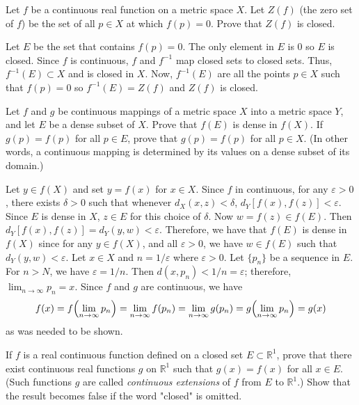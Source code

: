 \begin{exercise}
\item
  \label{4.3}
  Let \(f\) be a continuous real function on a metric space \(X\).
  Let \(Z(f)\) (the zero set of \(f\)) be the set of all \(p\in X\) at which
  \(f(p) = 0\).
  Prove that \(Z(f)\) is closed.
  \par\smallskip
  Let \(E\) be the set that contains \(f(p) = 0\).
  The only element in \(E\) is \(0\) so \(E\) is closed.
  Since \(f\) is continuous, \(f\) and \(f^{-1}\) map closed sets to closed
  sets.
  Thus, \(f^{-1}(E)\subset X\) and is closed in \(X\).
  Now, \(f^{-1}(E)\) are all the points \(p\in X\) such that \(f(p) = 0\) so
  \(f^{-1}(E) = Z(f)\) and \(Z(f)\) is closed.
\item
  \label{4.4}
  Let \(f\) and \(g\) be continuous mappings of a metric space \(X\) into a
  metric space \(Y\), and let \(E\) be a dense subset of \(X\).
  Prove that \(f(E)\) is dense in \(f(X)\).
  If \(g(p) = f(p)\) for all \(p\in E\), prove that \(g(p) = f(p)\) for all
  \(p\in X\).
  (In other words, a continuous mapping is determined by its values on a dense
  subset of its domain.)
  \par\smallskip
  Let \(y\in f(X)\) and set \(y = f(x)\) for \(x\in X\).
  Since \(f\) in continuous, for any \(\varepsilon > 0\), there exists
  \(\delta > 0\) such that whenever \(d_X(x,z) < \delta\),
  \(d_Y[f(x),f(z)] < \varepsilon\).
  Since \(E\) is dense in \(X\), \(z\in E\) for this choice of \(\delta\).
  Now \(w = f(z)\in f(E)\).
  Then \(d_Y[f(x),f(z)] = d_Y(y,w) < \varepsilon\).
  Therefore, we have that \(f(E)\) is dense in \(f(X)\) since for any
  \(y\in f(X)\), and all \(\varepsilon > 0\), we have \(w\in f(E)\) such that
  \(d_Y(y,w) < \varepsilon\).
  Let \(x\in X\) and \(n = 1/\varepsilon\) where \(\varepsilon > 0\).
  Let \(\{p_n\}\) be a sequence in \(E\).
  For \(n > N\), we have \(\varepsilon = 1/n\).
  Then \(d(x,p_n) < 1/n = \varepsilon\); therefore, \(\lim_{n\to\infty}p_n = x\).
  Since \(f\) and \(g\) are continuous, we have
  \[
  f(x) = f\Bigl(\lim_{n\to\infty}p_n\Bigr) = \lim_{n\to\infty}f(p_n)
  = \lim_{n\to\infty}g(p_n) = g\Bigl(\lim_{n\to\infty}p_n\Bigr) = g(x)
  \]
  as was needed to be shown.
\item
  \label{4.5}
  If \(f\) is a real continuous function defined on a closed set
  \(E\subset\mathbb{R}^1\), prove that there exist continuous real functions
  \(g\) on \(\mathbb{R}^1\) such that \(g(x) = f(x)\) for all \(x\in E\).
  (Such functions \(g\) are called \textit{continuous extensions} of \(f\) from
  \(E\) to \(\mathbb{R}^1\).)
  Show that the result becomes false if the word "closed" is omitted.

\end{exercise}

